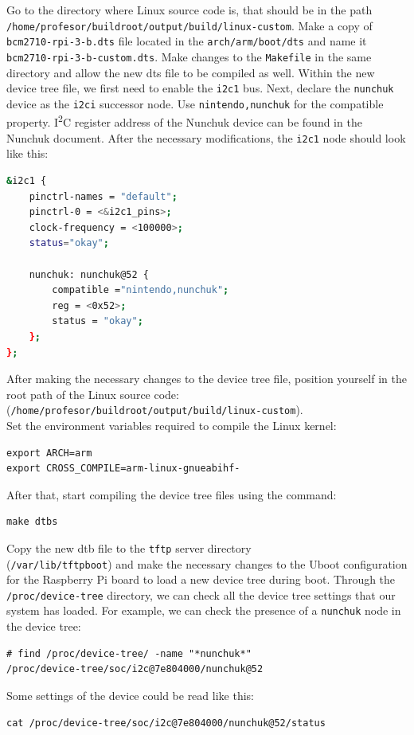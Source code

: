 \documentclass[11pt]{article}
\begin{document}
Go to the directory where Linux source code is, that should be in the path\\
\texttt{/home/profesor/buildroot/output/build/linux-custom}. Make a copy of\\
\texttt{bcm2710-rpi-3-b.dts} file located in the \texttt{arch/arm/boot/dts} and
name it \texttt{bcm2710-rpi-3-b-custom.dts}. Make changes to the
\texttt{Makefile} in the same directory and allow the new dts file to be
compiled as well.
\newline
\newline
Within the new device tree file, we first need to enable the \texttt{i2c1} bus.
Next, declare the \texttt{nunchuk} device as the \texttt{i2ci} successor node.
Use \texttt{nintendo,nunchuk} for the compatible property. I\textsuperscript{2}C
register address of the Nunchuk device can be found in the Nunchuk document.
\newline
\newline
After the necessary modifications, the \texttt{i2c1} node should look like this:
\begin{lstlisting}[language=bash]
&i2c1 {
	pinctrl-names = "default";
	pinctrl-0 = <&i2c1_pins>;
	clock-frequency = <100000>;
	status="okay";

	nunchuk: nunchuk@52 {
		compatible ="nintendo,nunchuk";
		reg = <0x52>;
		status = "okay";
	};
};
\end{lstlisting}
After making the necessary changes to the device tree file, position yourself
in the root path of the Linux source code:\\
(\texttt{/home/profesor/buildroot/output/build/linux-custom}).\\
Set the environment variables required to compile the Linux kernel:
\begin{lstlisting}
export ARCH=arm
export CROSS_COMPILE=arm-linux-gnueabihf-
\end{lstlisting}
After that, start compiling the device tree files using the command:
\begin{lstlisting}
make dtbs
\end{lstlisting}
Copy the new dtb file to the \texttt{tftp} server directory\\
(\texttt{/var/lib/tftpboot}) and make the necessary changes to the Uboot
configuration for the Raspberry Pi board to load a new device tree during boot.
\newline
\newline
Through the \texttt{/proc/device-tree} directory, we can check all the device
tree settings that our system has loaded.
\newline
For example, we can check the presence of a \texttt{nunchuk} node in the device
tree:
\begin{lstlisting}
# find /proc/device-tree/ -name "*nunchuk*"
/proc/device-tree/soc/i2c@7e804000/nunchuk@52
\end{lstlisting}
Some settings of the device could be read like this:
\begin{lstlisting}
cat /proc/device-tree/soc/i2c@7e804000/nunchuk@52/status
\end{lstlisting}
\end{document}
